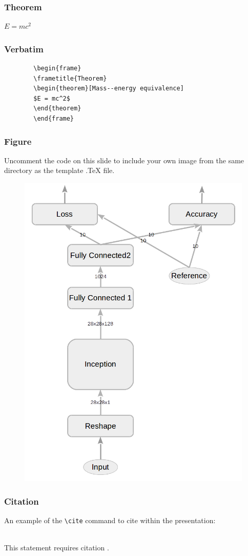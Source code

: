 \documentclass{beamer}
\begin{document}
\begin{frame}
	\frametitle{Theorem}
	\begin{theorem}
		$E = mc^2$
	\end{theorem}
\end{frame}

\begin{frame}[fragile] %
	\frametitle{Verbatim}
	\begin{example}
		\begin{verbatim}
		\begin{frame}
		\frametitle{Theorem}
		\begin{theorem}[Mass--energy equivalence]
		$E = mc^2$
		\end{theorem}
		\end{frame}\end{verbatim}
	\end{example}
\end{frame}

\begin{frame}
	\frametitle{Figure}
	Uncomment the code on this slide to include your own image from the same directory as the template .TeX file.
	\begin{figure}
		\includegraphics[width=0.4\linewidth]{images/main_graph_inception_reduced.png}
	\end{figure}
\end{frame}

\begin{frame}[fragile] %
\frametitle{Citation}
An example of the \verb|\cite| command to cite within the presentation:\\~

This statement requires citation \cite{p1}.
\end{frame}
\end{document}
